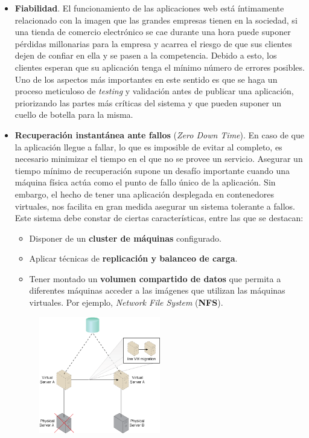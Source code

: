 \begin{itemize}
\item \textbf{Fiabilidad}. El funcionamiento de las aplicaciones web está íntimamente relacionado con la imagen que las grandes empresas tienen en la sociedad, si una tienda de comercio electrónico se cae durante una hora puede suponer pérdidas millonarias para la empresa y acarrea el riesgo de que sus clientes dejen de confiar en ella y se pasen a la competencia. Debido a esto, los clientes esperan que su aplicación tenga el mínimo número de errores posibles. Uno de los aspectos más importantes en este sentido es que se haga un proceso meticuloso de \emph{testing} y validación antes de publicar una aplicación, priorizando las partes más críticas del sistema y que pueden suponer un cuello de botella para la misma.
\item \textbf{Recuperación instantánea ante fallos} (\emph{Zero Down Time}\cite{zdwt}). En caso de que la aplicación llegue a fallar, lo que es imposible de evitar al completo, es necesario minimizar el tiempo en el que no se provee un servicio. Asegurar un tiempo mínimo de recuperación supone un desafío importante cuando una máquina física actúa como el punto de fallo único de la aplicación. Sin embargo, el hecho de tener una aplicación desplegada en contenedores virtuales, nos facilita en gran medida asegurar un sistema tolerante a fallos. Este sistema debe constar de ciertas características, entre las que se destacan:
\begin{itemize}
\item Disponer de un \textbf{cluster de máquinas} configurado.
\item Aplicar técnicas de \textbf{replicación y balanceo de carga}.
\item Tener montado un \textbf{volumen compartido de datos} que permita a diferentes máquinas acceder a las imágenes que utilizan las máquinas virtuales. Por ejemplo, \emph{Network File System} (\textbf{NFS}).
\end{itemize}
\begin{figure}
\centering
\includegraphics[width=0.5\textwidth]{spof.png}

\end{figure}
\end{itemize}

